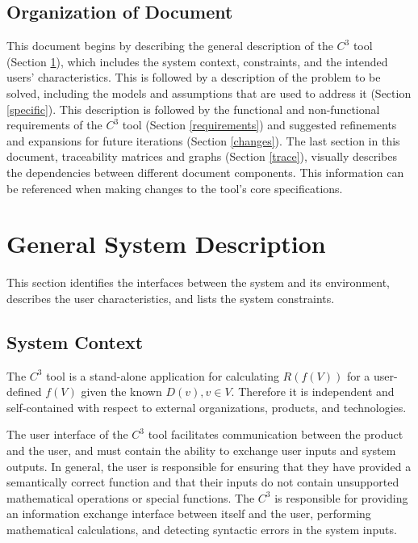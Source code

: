 \documentclass[12pt]{article}
\newcommand{\prognameAbbrv}{$C^{3}$}
\begin{document}
\subsection{Organization of Document}
This document begins by describing the general description of the 
\prognameAbbrv{} tool (Section \ref{general}), which includes the system 
context, constraints, and the intended users' characteristics. This is followed 
by a description of the problem to be solved, including the models and 
assumptions that are used to address it (Section \ref{specific}). This 
description is followed by the functional and non-functional requirements of 
the \prognameAbbrv{} tool (Section \ref{requirements}) and suggested 
refinements and expansions for future iterations (Section \ref{changes}). The 
last section in this document, traceability matrices and graphs (Section 
\ref{trace}), visually describes the dependencies between different document 
components. This information can be referenced when making changes to the 
tool's core specifications.

\section{General System Description}
\label{general}

This section identifies the interfaces between the system and its environment,
describes the user characteristics, and lists the system constraints.

\subsection{System Context}
The \prognameAbbrv{} tool is a stand-alone application for calculating 
$R(f(V))$ for a user-defined $f(V)$ given the known $D(v), v\in V$. Therefore 
it is independent and self-contained with respect to external organizations, 
products, and technologies.

The user interface of the \prognameAbbrv{} tool facilitates communication 
between the product and the user, and must contain the ability to exchange user 
inputs and system outputs. In general, the user is responsible for ensuring 
that they have provided a semantically correct function and that their inputs 
do not contain unsupported mathematical operations or special functions. The 
\prognameAbbrv{} is responsible for providing an information exchange interface 
between itself and the user, performing mathematical calculations, and 
detecting syntactic errors in the system inputs.
\end{document}
